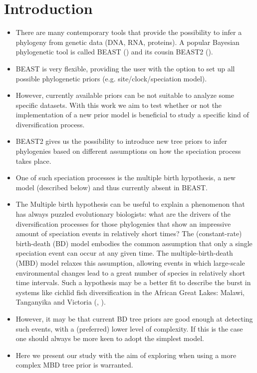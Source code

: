 \documentclass{article}
\begin{document}
\section{Introduction}
\begin{itemize}

\item There are many contemporary tools that provide the possibility 
to infer a phylogeny from genetic data (DNA, RNA, proteins). 
A popular Bayesian phylogenetic tool is called BEAST (\cite{beast}) 
and its cousin BEAST2 (\cite{beast2}).

\item BEAST is very flexible, providing the user with the option 
to set up all possible phylogenetic priors (e.g. site/clock/speciation model).

\item However, currently available priors can be not suitable 
to analyze some specific datasets. 
With this work we aim to test whether or not 
the implementation of a new prior model 
is beneficial to study a specific kind of diversification process.

\item BEAST2 gives us the possibility to introduce new tree priors 
to infer phylogenies based on different assumptions 
on how the speciation process takes place.

\item One of such speciation processes is the multiple birth hypothesis,
a new model (described below) and thus currently absent in BEAST.

\item The Multiple birth hypothesis can be useful to explain a phenomenon 
that has always puzzled evolutionary biologists: 
what are the drivers of the diversification processes 
for those phylogenies that show an impressive amount of speciation events 
in relatively short times? 
The (constant-rate) birth-death (BD) model embodies the common assumption that 
only a single speciation event can occur at any given time.
The multiple-birth-death (MBD) model 
relaxes this assumption, allowing events in which 
large-scale environmental changes lead to a great number of species 
in relatively short time intervals. 
Such a hypothesis may be a better fit to describe the burst in systems 
like cichlid fish diversification in the 
African Great Lakes: Malawi, Tanganyika and Victoria 
(\cite{janzen2016}, \cite{janzen2017}).

\item However, it may be that current BD tree priors are good enough 
at detecting such events, with a (preferred) lower level of complexity. 
If this is the case one should always be more keen to adopt the simplest model.

\item Here we present our study with the aim of exploring 
when using a more complex MBD tree prior is warranted.

\end{itemize}
\end{document}
